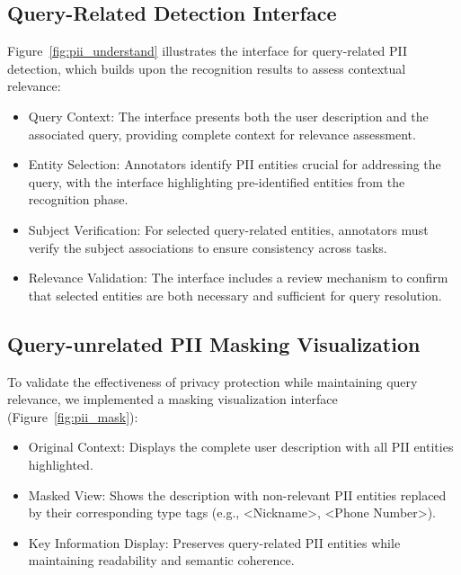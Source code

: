 \subsection{Query-Related Detection Interface}
Figure~\ref{fig:pii_understand} illustrates the interface for query-related PII detection, which builds upon the recognition results to assess contextual relevance:
\begin{itemize}
\item Query Context: The interface presents both the user description and the associated query, providing complete context for relevance assessment.
\item Entity Selection: Annotators identify PII entities crucial for addressing the query, with the interface highlighting pre-identified entities from the recognition phase.
\item Subject Verification: For selected query-related entities, annotators must verify the subject associations to ensure consistency across tasks.
\item Relevance Validation: The interface includes a review mechanism to confirm that selected entities are both necessary and sufficient for query resolution.
\end{itemize}
\subsection{Query-unrelated PII Masking Visualization}
To validate the effectiveness of privacy protection while maintaining query relevance, we implemented a masking visualization interface (Figure~\ref{fig:pii_mask}):
\begin{itemize}
\item Original Context: Displays the complete user description with all PII entities highlighted.
\item Masked View: Shows the description with non-relevant PII entities replaced by their corresponding type tags (e.g., <Nickname>, <Phone Number>).
\item Key Information Display: Preserves query-related PII entities while maintaining readability and semantic coherence.
\end{itemize}
